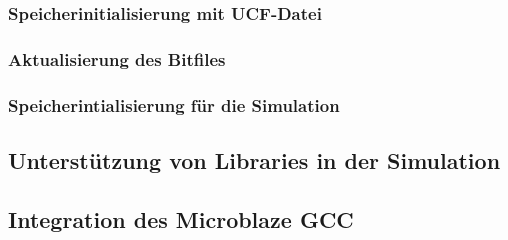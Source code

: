 \subsubsection{Speicherinitialisierung mit UCF-Datei}

\subsubsection{Aktualisierung des Bitfiles}

\subsubsection{Speicherintialisierung für die Simulation}

\subsection{Unterstützung von Libraries in der Simulation}

\subsection{Integration des Microblaze GCC}

